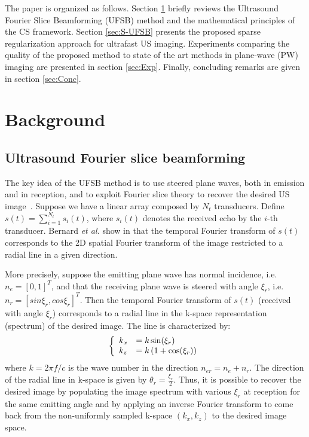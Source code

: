 \documentclass[conference]{IEEEtran}
\newcommand{\etal}{\textit{et al.}}
\begin{document}
\par The paper is organized as follows. Section \ref{sec:Back} briefly reviews the Ultrasound Fourier Slice Beamforming (UFSB) method and the mathematical principles of the CS framework. Section \ref{sec:S-UFSB} presents the proposed sparse regularization approach for ultrafast US imaging. Experiments comparing the quality of the proposed method to state of the art methods in plane-wave (PW) imaging are presented in section \ref{sec:Exp}. Finally, concluding remarks are given in section \ref{sec:Conc}. 

\section{Background}
\label{sec:Back}
\subsection{Ultrasound Fourier slice beamforming}
\label{ssec:UFSB}
The key idea of the UFSB method is to use steered plane waves, both in emission and in reception, and to exploit Fourier slice theory to recover the desired US image~\cite{Bernard_IUS_2014}. Suppose we have a linear array composed by $N_t$ transducers. Define $s(t)=\sum_{i=1}^{N_t}s_i(t)$, where $s_i(t)$ denotes the received echo by the $i$-th transducer. Bernard \etal \: show in \cite{Bernard_IUS_2014} that the temporal Fourier transform of $s(t)$ corresponds to the 2D spatial Fourier transform of the image restricted to a radial line in a given direction.  

More precisely, suppose the emitting plane wave has normal incidence, i.e. $n_e = [0, 1]^T$, and that the receiving plane wave is steered with angle $\xi_r$, i.e. $n_r = [sin \xi_r, cos \xi_r]^T$. Then the temporal Fourier transform of $s(t)$ (received with angle $\xi_r$) corresponds to a radial line in the k-space representation (spectrum) of the desired image. The line is characterized by: 
\begin{align}
\left\lbrace
\begin{array}{l l}
k_x &= k \sin ( \xi_r )\\
k_z &= k \left( 1+ \cos ( \xi_r ) \right) 
\end{array}
\right.
\end{align}
where $k=2\pi f/c$ is the wave number in the direction $n_{er}=n_e+n_r$. The direction of the radial line in k-space is given by $\theta_r= \frac{\xi_r}{2}$. Thus, it is possible to recover the desired image by populating the image spectrum with various $\xi_r$ at reception for the same emitting angle and by applying an inverse Fourier transform to come back from the non-uniformly sampled k-space $\left( k_x, k_z \right)$ to the desired image space.
\end{document}
